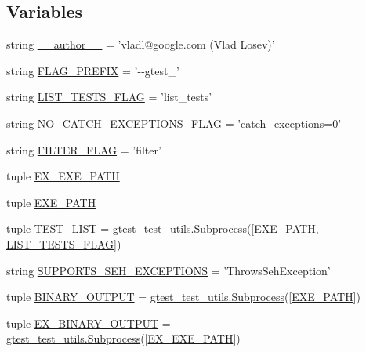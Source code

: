 \subsection*{\-Variables}
\begin{DoxyCompactItemize}
\item 
string \hyperlink{namespacegtest__catch__exceptions__test_a629d61dfe4da763164a4d1a2d85b0afd}{\-\_\-\-\_\-author\-\_\-\-\_\-} = 'vladl@google.\-com (\-Vlad \-Losev)'
\item 
string \hyperlink{namespacegtest__catch__exceptions__test_a039a9c55dc7e4ad6e844e99fcb46d665}{\-F\-L\-A\-G\-\_\-\-P\-R\-E\-F\-I\-X} = '-\/-\/gtest\-\_\-'
\item 
string \hyperlink{namespacegtest__catch__exceptions__test_a6bd797257f4db78c152b6e62341177db}{\-L\-I\-S\-T\-\_\-\-T\-E\-S\-T\-S\-\_\-\-F\-L\-A\-G} = 'list\-\_\-tests'
\item 
string \hyperlink{namespacegtest__catch__exceptions__test_a4aea69aa81762a7c9b8e83091ff08acd}{\-N\-O\-\_\-\-C\-A\-T\-C\-H\-\_\-\-E\-X\-C\-E\-P\-T\-I\-O\-N\-S\-\_\-\-F\-L\-A\-G} = 'catch\-\_\-exceptions=0'
\item 
string \hyperlink{namespacegtest__catch__exceptions__test_a4e1a92405aa6d661157f2f8498692796}{\-F\-I\-L\-T\-E\-R\-\_\-\-F\-L\-A\-G} = 'filter'
\item 
tuple \hyperlink{namespacegtest__catch__exceptions__test_ae7e7ed3d46ad6c855a70460742235eaf}{\-E\-X\-\_\-\-E\-X\-E\-\_\-\-P\-A\-T\-H}
\item 
tuple \hyperlink{namespacegtest__catch__exceptions__test_a216df3f485400b109390103528720888}{\-E\-X\-E\-\_\-\-P\-A\-T\-H}
\item 
tuple \hyperlink{namespacegtest__catch__exceptions__test_af311438eeeafe980513dabce72b172b7}{\-T\-E\-S\-T\-\_\-\-L\-I\-S\-T} = \hyperlink{classgtest__test__utils_1_1Subprocess}{gtest\-\_\-test\-\_\-utils.\-Subprocess}(\mbox{[}\hyperlink{namespacegtest__catch__exceptions__test_a216df3f485400b109390103528720888}{\-E\-X\-E\-\_\-\-P\-A\-T\-H}, \hyperlink{namespacegtest__catch__exceptions__test_a6bd797257f4db78c152b6e62341177db}{\-L\-I\-S\-T\-\_\-\-T\-E\-S\-T\-S\-\_\-\-F\-L\-A\-G}\mbox{]})
\item 
string \hyperlink{namespacegtest__catch__exceptions__test_ad0541e9612db1575a943ae9328374582}{\-S\-U\-P\-P\-O\-R\-T\-S\-\_\-\-S\-E\-H\-\_\-\-E\-X\-C\-E\-P\-T\-I\-O\-N\-S} = '\-Throws\-Seh\-Exception'
\item 
tuple \hyperlink{namespacegtest__catch__exceptions__test_a56bdc6950eebf373957d0626ee2b1456}{\-B\-I\-N\-A\-R\-Y\-\_\-\-O\-U\-T\-P\-U\-T} = \hyperlink{classgtest__test__utils_1_1Subprocess}{gtest\-\_\-test\-\_\-utils.\-Subprocess}(\mbox{[}\hyperlink{namespacegtest__catch__exceptions__test_a216df3f485400b109390103528720888}{\-E\-X\-E\-\_\-\-P\-A\-T\-H}\mbox{]})
\item 
tuple \hyperlink{namespacegtest__catch__exceptions__test_a66e1c6456230fc5971eefa2eee792d12}{\-E\-X\-\_\-\-B\-I\-N\-A\-R\-Y\-\_\-\-O\-U\-T\-P\-U\-T} = \hyperlink{classgtest__test__utils_1_1Subprocess}{gtest\-\_\-test\-\_\-utils.\-Subprocess}(\mbox{[}\hyperlink{namespacegtest__catch__exceptions__test_ae7e7ed3d46ad6c855a70460742235eaf}{\-E\-X\-\_\-\-E\-X\-E\-\_\-\-P\-A\-T\-H}\mbox{]})
\end{DoxyCompactItemize}


